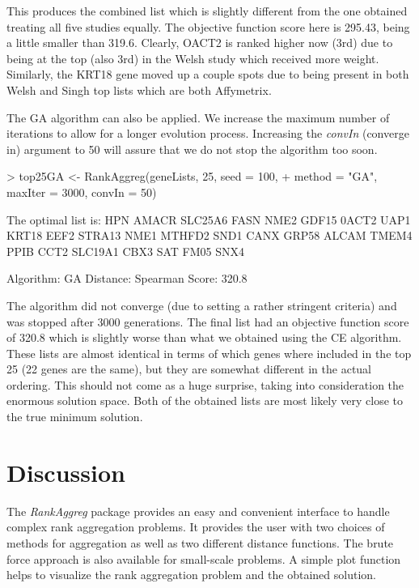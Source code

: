 \documentclass[11pt]{article}
\begin{document}
This produces the combined list which is slightly
different from the one obtained treating all five studies equally.
The objective function score here is 295.43, being a little smaller
than 319.6. Clearly, OACT2 is ranked higher now (3rd) due to being
at the top (also 3rd) in the Welsh study which received more weight.
Similarly, the KRT18 gene moved up a couple spots due to being
present in both Welsh and Singh top lists which are both Affymetrix.

The GA algorithm can also be applied. We increase the maximum number
of iterations to allow for a longer evolution process. Increasing
the \emph{convIn} (converge in) argument to 50 will assure that we
do not stop the algorithm too soon.

\begin{Schunk}
\begin{Sinput}
> top25GA <- RankAggreg(geneLists, 25, seed = 100, 
+     method = "GA", maxIter = 3000, convIn = 50)
\end{Sinput}
\end{Schunk}

\begin{Schunk}
\begin{Soutput}
The optimal list is: 
        HPN AMACR SLC25A6 FASN NME2 GDF15 0ACT2 UAP1 KRT18 EEF2
        STRA13 NME1 MTHFD2 SND1 CANX GRP58 ALCAM TMEM4 PPIB CCT2
        SLC19A1 CBX3 SAT FM05 SNX4

  Algorithm:   GA
  Distance:    Spearman
  Score:       320.8 
\end{Soutput}
\end{Schunk}
The algorithm did not converge (due to setting a rather stringent
criteria) and was stopped after 3000 generations. The final list had
an objective function score of 320.8 which is slightly worse than
what we obtained using the CE algorithm. These lists are almost
identical in terms of which genes where included in the top 25 (22
genes are the same), but they are somewhat different in the actual
ordering. This should not come as a huge surprise, taking into consideration 
the enormous solution space. Both of the obtained lists are most likely very 
close to the true minimum solution.

\section{Discussion}
The \emph{RankAggreg} package provides an easy and convenient interface to handle complex
rank aggregation problems. It provides the user with two choices of methods for aggregation as
well as two different distance functions. The brute force approach is also available for
small-scale problems. A simple plot function helps to visualize the rank aggregation problem 
and the obtained solution. 
\end{document}
